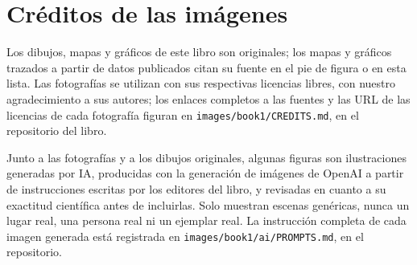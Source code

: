 \chapter*{Créditos de las imágenes}

Los dibujos, mapas y gráficos de este libro son originales; los mapas y
gráficos trazados a partir de datos publicados citan su fuente en el pie de
figura o en esta lista. Las fotografías se utilizan con sus respectivas
licencias libres, con nuestro agradecimiento a sus autores; los enlaces
completos a las fuentes y las URL de las licencias de cada fotografía
figuran en \texttt{images/book1/CREDITS.md}, en el repositorio del libro.

\bigskip
Junto a las fotografías y a los dibujos originales, algunas figuras son
ilustraciones generadas por IA, producidas con la generación de imágenes de
OpenAI a partir de instrucciones escritas por los editores del libro, y
revisadas en cuanto a su exactitud científica antes de incluirlas. Solo
muestran escenas genéricas, nunca un lugar real, una persona real ni un
ejemplar real. La instrucción completa de cada imagen generada está
registrada en \texttt{images/book1/ai/PROMPTS.md}, en el repositorio.

